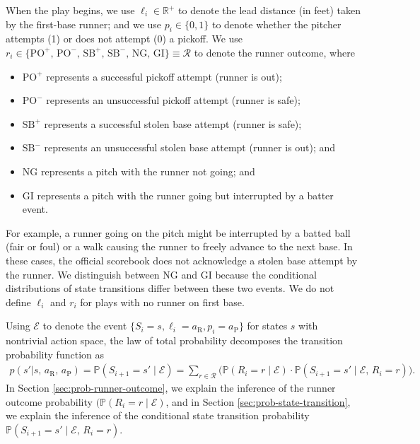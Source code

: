 \documentclass[aoas]{imsart}
\begin{document}
    When the play begins, we use $\ell_i \in \mathbb{R}^+$ to denote the lead distance (in feet) taken by the first-base runner; and we use $p_i \in \{0, 1\}$ to denote whether the pitcher attempts (1) or does not attempt (0) a pickoff. We use $r_i \in \{\mbox{PO}^+,\, \mbox{PO}^-,\, \mbox{SB}^+,\, \mbox{SB}^-,\, \mbox{NG},\, \mbox{GI}\} \equiv \mathcal{R}$ to denote the runner outcome, where
    \begin{itemize}
      \item $\mbox{PO}^+$ represents a successful pickoff attempt (runner is out);
      \item $\mbox{PO}^-$ represents an unsuccessful pickoff attempt (runner is safe);
      \item $\mbox{SB}^+$ represents a successful stolen base attempt (runner is safe);
      \item $\mbox{SB}^-$ represents an unsuccessful stolen base attempt (runner is out); and
      \item $\mbox{NG}$ represents a pitch with the runner not going; and
      \item $\mbox{GI}$ represents a pitch with the runner going but interrupted by a batter event.
    \end{itemize}
    For example, a runner going on the pitch might be interrupted by a batted ball (fair or foul) or a walk causing the runner to freely advance to the next base. In these cases, the official scorebook does not acknowledge a stolen base attempt by the runner. We distinguish between NG and GI because the conditional distributions of state transitions differ between these two events. We do not define $\ell_i$ and $r_i$ for plays with no runner on first base.
    
    Using $\mathcal{E}$ to denote the event $\{S_i = s, \ell_i = a_\text{R}, p_i = a_\text{P}\}$ for states $s$ with nontrivial action space, the law of total probability decomposes the transition probability function as
    \begin{align}
      \label{eqn:prob-state-transition-two-player}
        p(s'|s,\, a_\text{R},\, a_\text{P}) = \mathbb{P}(S_{i+1} = s' \mid \mathcal{E}) = \sum_{r \in \mathcal{R}} \big(\mathbb{P}(R_i = r \mid \mathcal{E}) \cdot \mathbb{P}(S_{i+1} = s' \mid \mathcal{E},\, R_i = r)\big).
    \end{align}
    In Section \ref{sec:prob-runner-outcome}, we explain the inference of the runner outcome probability $\big(\mathbb{P}(R_i = r \mid \mathcal{E})$, and in Section \ref{sec:prob-state-transition}, we explain the inference of the conditional state transition probability $\mathbb{P}(S_{i+1} = s' \mid \mathcal{E},\, R_i = r)$.
\end{document}
